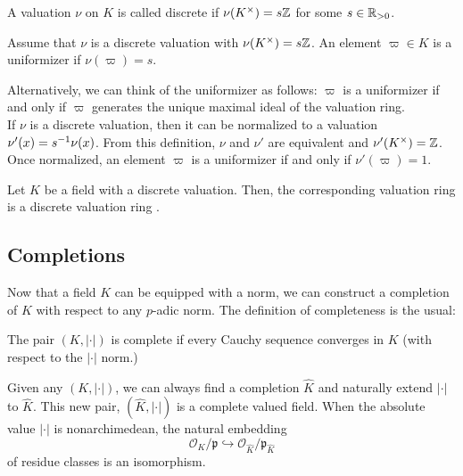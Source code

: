 \begin{definition}

    A valuation $\nu$ on $K$ is called discrete if $\nu(K^\times) = s\mathbb{Z}$ for some $s \in \mathbb{R}_{>0}$.
\end{definition}

\begin{definition}[Uniformizer]
    Assume that $\nu$ is a discrete valuation with $\nu(K^\times) = s\mathbb{Z}$. An element $\varpi \in K$ is a uniformizer if $\nu(\varpi) = s$.
\end{definition}

Alternatively, we can think of the uniformizer as follows: $\varpi$ is a uniformizer if and only if $\varpi$ generates the unique maximal ideal of the valuation ring.\\

If $\nu$ is a discrete valuation, then it can be normalized to a valuation $\nu'(x) = s^{-1} \nu(x)$.  From this definition, $\nu$ and $\nu'$ are equivalent and $\nu'(K^\times) = \mathbb{Z}$. Once normalized, an element $\varpi$ is a uniformizer if and only if $\nu'(\varpi) = 1$.

\begin{proposition}
    Let $K$ be a field with a discrete valuation. Then, the corresponding valuation ring is a discrete valuation ring .
\end{proposition}

\subsection{Completions}

Now that a field $K$ can be equipped with a norm, we can construct a completion of $K$ with respect to any $p$-adic norm. The definition of completeness is the usual:

\begin{definition}[Complete]
    The pair $(K, |\cdot|)$ is complete if every Cauchy sequence converges in $K$ (with respect to the $|\cdot|$ norm.)
\end{definition}

Given any $(K, |\cdot|)$, we can always find a completion $\hat{K}$ and naturally extend $|\cdot|$ to $\hat{K}$. This new pair, $(\hat{K}, |\cdot|)$ is a complete valued field. When the absolute value $|\cdot|$ is nonarchimedean, the natural embedding
    \[\mathcal{O}_{K}/\mathfrak{p} \hookrightarrow \mathcal{O}_{\hat{K}}/\mathfrak{p}_{\hat{K}}\]
of residue classes is an isomorphism.

